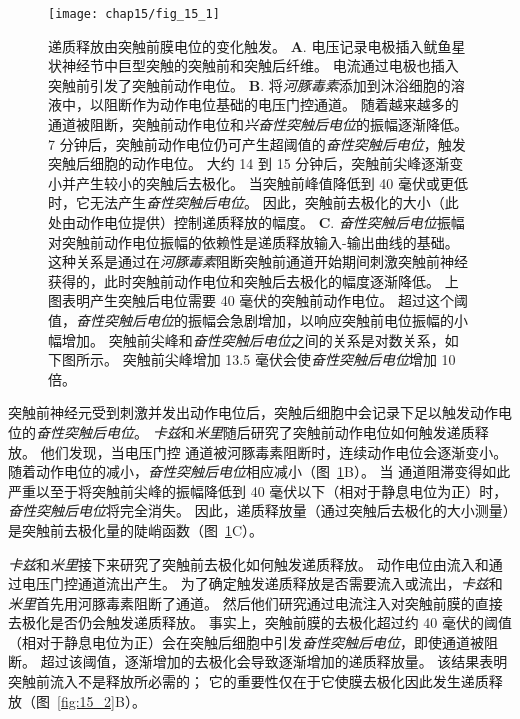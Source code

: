\begin{figure}[htbp]
	\centering
	\texttt{[image: chap15/fig\_15\_1]}
	\caption{递质释放由突触前膜电位的变化触发\cite{katz1967study}。
	\textbf{A}. 电压记录电极插入鱿鱼星状神经节中巨型突触的突触前和突触后纤维。
	电流通过电极也插入突触前引发了突触前动作电位。
	\textbf{B}. 将\textit{河豚毒素}添加到沐浴细胞的溶液中，以阻断作为动作电位基础的电压门控通道。
	随着越来越多的通道被阻断，突触前动作电位和\textit{兴奋性突触后电位}的振幅逐渐降低。
	7 分钟后，突触前动作电位仍可产生超阈值的\textit{奋性突触后电位}，触发突触后细胞的动作电位。
	大约 14 到 15 分钟后，突触前尖峰逐渐变小并产生较小的突触后去极化。
	当突触前峰值降低到 40 毫伏或更低时，它无法产生\textit{奋性突触后电位}。
	因此，突触前去极化的大小（此处由动作电位提供）控制递质释放的幅度。
	\textbf{C}. \textit{奋性突触后电位}振幅对突触前动作电位振幅的依赖性是递质释放输入-输出曲线的基础。
	这种关系是通过在\textit{河豚毒素}阻断突触前通道开始期间刺激突触前神经获得的，此时突触前动作电位和突触后去极化的幅度逐渐降低。
	上图表明产生突触后电位需要 40 毫伏的突触前动作电位。
	超过这个阈值，\textit{奋性突触后电位}的振幅会急剧增加，以响应突触前电位振幅的小幅增加。
	突触前尖峰和\textit{奋性突触后电位}之间的关系是对数关系，如下图所示。
	突触前尖峰增加 13.5 毫伏会使\textit{奋性突触后电位}增加 10 倍。}
	\label{fig:15_1}
\end{figure}
突触前神经元受到刺激并发出动作电位后，突触后细胞中会记录下足以触发动作电位的\textit{奋性突触后电位}。
\textit{卡兹}和\textit{米里}随后研究了突触前动作电位如何触发递质释放。
他们发现，当电压门控  通道被河豚毒素阻断时，连续动作电位会逐渐变小。
随着动作电位的减小，\textit{奋性突触后电位}相应减小（图~\ref{fig:15_1}B）。
当  通道阻滞变得如此严重以至于将突触前尖峰的振幅降低到 40 毫伏以下（相对于静息电位为正）时，\textit{奋性突触后电位}将完全消失。
因此，递质释放量（通过突触后去极化的大小测量）是突触前去极化量的陡峭函数（图~\ref{fig:15_1}C）。


\textit{卡兹}和\textit{米里}接下来研究了突触前去极化如何触发递质释放。
动作电位由流入和通过电压门控通道流出产生。
为了确定触发递质释放是否需要流入或流出，\textit{卡兹}和\textit{米里}首先用河豚毒素阻断了通道。
然后他们研究通过电流注入对突触前膜的直接去极化是否仍会触发递质释放。
事实上，突触前膜的去极化超过约 40 毫伏的阈值（相对于静息电位为正）会在突触后细胞中引发\textit{奋性突触后电位}，即使通道被阻断。
超过该阈值，逐渐增加的去极化会导致逐渐增加的递质释放量。
该结果表明突触前流入不是释放所必需的；
它的重要性仅在于它使膜去极化因此发生递质释放（图~\ref{fig:15_2}B）。


